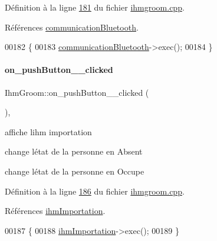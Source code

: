 Définition à la ligne \hyperlink{ihmgroom_8cpp_source_l00181}{181} du fichier \hyperlink{ihmgroom_8cpp_source}{ihmgroom.\+cpp}.



Références \hyperlink{ihmgroom_8h_source_l00086}{communication\+Bluetooth}.


\begin{DoxyCode}
00182 \{
00183     \hyperlink{class_ihm_groom_a8e2b551df75d8dffdfbc9beb6c3691ba}{communicationBluetooth}->exec();
00184 \}
\end{DoxyCode}
\mbox{\label{class_ihm_groom_ac69005aef7c31e888d64890eb45c5e64}} 
\paragraph{\texorpdfstring{on\+\_\+push\+Button\+\_\+\_\+clicked}{on\_pushButton\_8\_clicked}}
{\footnotesize\ttfamily Ihm\+Groom\+::on\+\_\+push\+Button\+\_\+\_\+clicked (\begin{DoxyParamCaption}{ }\end{DoxyParamCaption})\hspace{0.3cm}{\ttfamily [private]}, {\ttfamily [slot]}}



affiche l\textquotesingle{}ihm importation 

change l\textquotesingle{}état de la personne en Absent

change l\textquotesingle{}état de la personne en Occupe 

Définition à la ligne \hyperlink{ihmgroom_8cpp_source_l00186}{186} du fichier \hyperlink{ihmgroom_8cpp_source}{ihmgroom.\+cpp}.



Références \hyperlink{ihmgroom_8h_source_l00087}{ihm\+Importation}.


\begin{DoxyCode}
00187 \{
00188     \hyperlink{class_ihm_groom_ab3f9d16d3e20234a71b1580d70ee4959}{ihmImportation}->exec();
00189 \}
\end{DoxyCode}
\mbox{\label{class_ihm_groom_a5f8398886e8daa04d5a0f3119f307f14}} 
